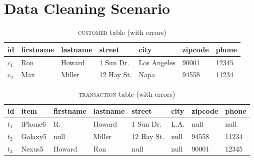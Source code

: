 \section{Data Cleaning Scenario}




\label{sec:example}
\begin{table}[h]\footnotesize
\scriptsize
\begin{tabular}{lllllll} \toprule 
\textbf{id} &  \textbf{firstname} & \textbf{lastname} & \textbf{street} & \textbf{city} & \textbf{zipcode} & \textbf{phone} \\ \midrule
$c_1$ & Ron & Howard & 1 Sun Dr. & Los Angeles & 90001 & 12345 \\
$c_2$ & Max & Miller & 12 Hay St. & Napa & 94558 & 11234 \\ \bottomrule
\end{tabular}
\vspace{-1em}
\caption{\textsc{customer} table (with errors)}
\label{tab:cust}
\end{table}

\begin{table}[h]\footnotesize
\scriptsize
\begin{tabular}{llllllll} \toprule 
\textbf{id} & \textbf{item} &  \textbf{firstname} & \textbf{lastname} & \textbf{street} & \textbf{city} & \textbf{zipcode} & \textbf{phone} \\ \midrule
$t_1$ & iPhone6 & R. & Howard & 1 Sun Dr. & L.A. & null & null \\
$t_2$ & Galaxy5 & null & Miller & 12 Hay St. & null & 94558 & 11234 \\
$t_3$ & Nexus5 & Howard & Ron & null & null & 90001 & 12345 \\ \bottomrule
\end{tabular}
\vspace{-1em}
\caption{\textsc{transaction} table (with errors)}
\label{tab:trans}
\end{table}



